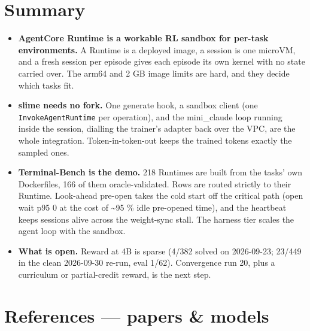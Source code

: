 \documentclass[
  paper=a4,
  ,captions=tableheading
]{scrartcl}
\providecommand{\tightlist}{%
  \setlength{\itemsep}{0pt}\setlength{\parskip}{0pt}}
\begin{document}
\hypertarget{summary}{%
\section{Summary}\label{summary}}

\begin{itemize}
\tightlist
\item
  \textbf{AgentCore Runtime is a workable RL sandbox for per-task
  environments.} A Runtime is a deployed image, a session is one
  microVM, and a fresh session per episode gives each episode its own
  kernel with no state carried over. The arm64 and 2 GB image limits are
  hard, and they decide which tasks fit.
\item
  \textbf{slime needs no fork.} One generate hook, a sandbox client (one
  \texttt{InvokeAgentRuntime} per operation), and the mini\_claude loop
  running inside the session, dialling the trainer's adapter back over
  the VPC, are the whole integration. Token-in-token-out keeps the
  trained tokens exactly the sampled ones.
\item
  \textbf{Terminal-Bench is the demo.} 218 Runtimes are built from the
  tasks' own Dockerfiles, 166 of them oracle-validated. Rows are routed
  strictly to their Runtime. Look-ahead pre-open takes the cold start
  off the critical path (open wait p95 0 at the cost of
  \textasciitilde95 \% idle pre-opened time), and the heartbeat keeps
  sessions alive across the weight-sync stall. The harness tier scales
  the agent loop with the sandbox.
\item
  \textbf{What is open.} Reward at 4B is sparse (4/382 solved on
  2026-09-23; 23/449 in the clean 2026-09-30 re-run, eval 1/62).
  Convergence run 20, plus a curriculum or partial-credit reward, is the
  next step.
\end{itemize}

\hypertarget{references-papers-models}{%
\section{References --- papers \&
models}\label{references-papers-models}}

\footnotesize
\end{document}
